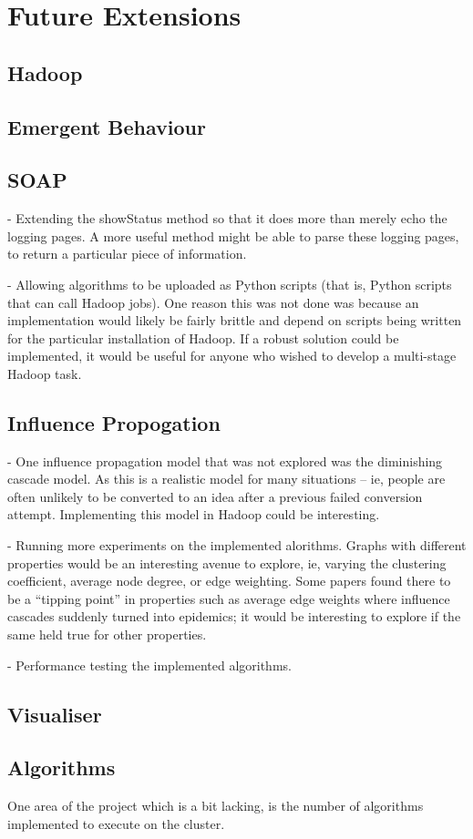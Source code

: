 \section{Future Extensions}


\subsection{Hadoop}

\subsection{Emergent Behaviour}

\subsection{SOAP}

- Extending the showStatus method so that it does more than merely echo the logging pages. A more useful method might be able to parse these logging pages, to return a particular piece of information.

- Allowing algorithms to be uploaded as Python scripts (that is, Python scripts that can call Hadoop jobs). One reason this was not done was because an implementation would likely be fairly brittle and depend on scripts being written for the particular installation of Hadoop. If a robust solution could be implemented, it would be useful for anyone who wished to develop a multi-stage Hadoop task. 

\subsection{Influence Propogation}

- One influence propagation model that was not explored was the diminishing cascade model. As this is a realistic model for many situations -- ie, people are often unlikely to be converted to an idea after a previous failed conversion attempt. Implementing this model in Hadoop could be interesting.

- Running more experiments on the implemented alorithms. Graphs with different properties would be an interesting avenue to explore, ie, varying the clustering coefficient, average node degree, or edge weighting. Some papers found there to be a ``tipping point'' in properties such as average edge weights where influence cascades suddenly turned into epidemics; it would be interesting to explore if the same held true for other properties.

- Performance testing the implemented algorithms.

\subsection{Visualiser}

\subsection{Algorithms}
One area of the project which is a bit lacking, is the number of algorithms implemented to execute on the cluster. 

